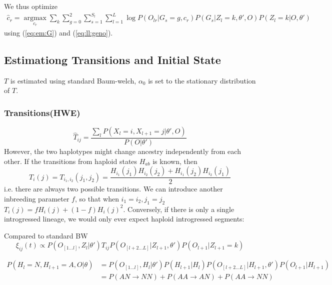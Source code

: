 \documentclass[10pt,a4paper]{article}
\begin{document}
We thus optimize
\begin{align}
\hat{c}_r = \operatorname*{argmax}_{c_r}\sum_k\sum_{g=0}^2 \sum_{s=1}^{S_l}\sum_{l=1}^L \log P(O_{lr} | G_s=g, c_r)  P(G_s|Z_l=k, \theta', O) P(Z_l=k | O, \theta')
\end{align}
using (\ref{eq:em:G}) and (\ref{eq:ll:geno}).
\subsection{Estimationg Transitions and Initial State}
$T$ is estimated using standard Baum-welch, $\alpha_0$ is set to the stationary distribution of $T$.
\subsubsection{Transitions(HWE)}
$$\hat{T}_{ij} = \frac{\sum_l P(X_l=i, X_{l+1}=j| \theta', O)}{ P(O | \theta')}$$
However, the two haplotypes might change ancestry independently from each other. If the transitions from haploid states $H_{ab}$ is known, then 
$$T_i(j) = T_{i_1, i_2}(j_1, j_2) = \frac{H_{i_1}(j_1)H_{i_2}(j_2) + H_{i_1}(j_2)H_{i_2}(j_1)}{2}$$
i.e. there are always two possible transitions. We can introduce another inbreeding parameter $f$, so that when $i_1=i_2, j_1=j_2$ 
$T_i(j) = f H_i(j) + (1-f) H_i(j)^2$. Conversely, if there is only a single introgressed lineage, we would only ever expect haploid introgressed segments:



Compared to standard BW
$$\xi_{ij}(t) \propto P(O_{[1\dots l]}, Z_l | \theta') T_{ij}  P(O_{[l+2\dots L]}|Z_{l+1}, \theta') P(O_{l+1}|Z_{l+1}=k)$$

\begin{align}
P(H_l = N, H_{l+1} = A, O |\theta) &=  P(O_{[1\dots l]}, H_l | \theta') P(H_{l+1} | H_l) P(O_{[l+2\dots L]}|H_{l+1}, \theta') P(O_{l+1}|H_{l+1})\\
&=P(AN \to NN) + P(AA \to AN) + P(AA \to NN)
\end{align}
\end{document}
